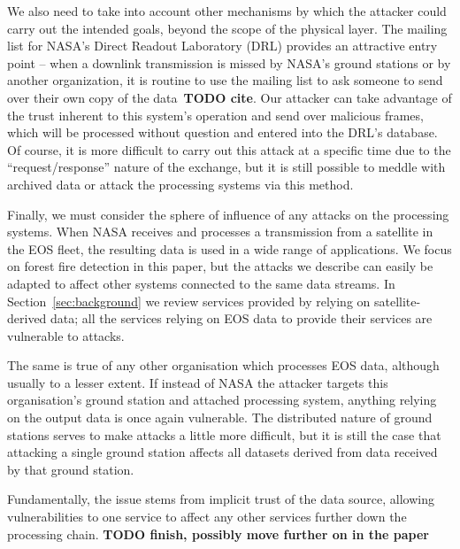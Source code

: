 We also need to take into account other mechanisms by which the attacker could carry out the intended goals, beyond the scope of the physical layer.
The mailing list for NASA's Direct Readout Laboratory (DRL) provides an attractive entry point -- when a downlink transmission is missed by NASA's ground stations or by another organization, it is routine to use the mailing list to ask someone to send over their own copy of the data~\textbf{TODO cite}.
Our attacker can take advantage of the trust inherent to this system's operation and send over malicious frames, which will be processed without question and entered into the DRL's database.
Of course, it is more difficult to carry out this attack at a specific time due to the ``request/response'' nature of the exchange, but it is still possible to meddle with archived data or attack the processing systems via this method.

Finally, we must consider the sphere of influence of any attacks on the processing systems.
When NASA receives and processes a transmission from a satellite in the EOS fleet, the resulting data is used in a wide range of applications.
We focus on forest fire detection in this paper, but the attacks we describe can easily be adapted to affect other systems connected to the same data streams.
In Section~\ref{sec:background} we review services provided by relying on satellite-derived data; all the services relying on EOS data to provide their services are vulnerable to attacks.

The same is true of any other organisation which processes EOS data, although usually to a lesser extent.
If instead of NASA the attacker targets this organisation's ground station and attached processing system, anything relying on the output data is once again vulnerable.
The distributed nature of ground stations serves to make attacks a little more difficult, but it is still the case that attacking a single ground station affects all datasets derived from data received by that ground station.

Fundamentally, the issue stems from implicit trust of the data source, allowing vulnerabilities to one service to affect any other services further down the processing chain.
\textbf{TODO finish, possibly move further on in the paper}



